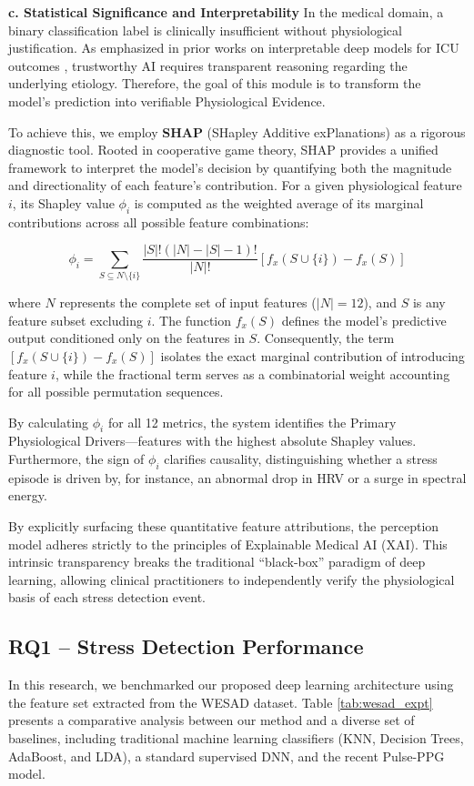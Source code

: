 \documentclass[journal,twoside,web]{ieeecolor}
\begin{document}
\textbf{c. Statistical Significance and Interpretability}
In the medical domain, a binary classification label is clinically insufficient without physiological justification. As emphasized in prior works on interpretable deep models for ICU outcomes \cite{che2017interpretable}, trustworthy AI requires transparent reasoning regarding the underlying etiology. Therefore, the goal of this module is to transform the model's prediction into verifiable Physiological Evidence.

To achieve this, we employ \textbf{SHAP} (SHapley Additive exPlanations) \cite{lundberg2017unified} as a rigorous diagnostic tool. Rooted in cooperative game theory, SHAP provides a unified framework to interpret the model's decision by quantifying both the magnitude and directionality of each feature's contribution. For a given physiological feature $i$, its Shapley value $\phi_i$ is computed as the weighted average of its marginal contributions across all possible feature combinations:

\begin{equation}
\phi_i = \sum_{S \subseteq N \setminus \{i\}} \frac{|S|! (|N| - |S| - 1)!}{|N|!} \left[ f_x(S \cup \{i\}) - f_x(S) \right]
\end{equation}

where $N$ represents the complete set of input features ($|N|=12$), and $S$ is any feature subset excluding $i$. The function $f_x(S)$ defines the model's predictive output conditioned only on the features in $S$. Consequently, the term $\left[ f_x(S \cup \{i\}) - f_x(S) \right]$ isolates the exact marginal contribution of introducing feature $i$, while the fractional term serves as a combinatorial weight accounting for all possible permutation sequences.

By calculating $\phi_i$ for all 12 metrics, the system identifies the Primary Physiological Drivers—features with the highest absolute Shapley values. Furthermore, the sign of $\phi_i$ clarifies causality, distinguishing whether a stress episode is driven by, for instance, an abnormal drop in HRV or a surge in spectral energy. 

By explicitly surfacing these quantitative feature attributions, the perception model adheres strictly to the principles of Explainable Medical AI (XAI). This intrinsic transparency breaks the traditional ``black-box'' paradigm of deep learning, allowing clinical practitioners to independently verify the physiological basis of each stress detection event.

\subsection{RQ1 – Stress Detection Performance}
In this research, we benchmarked our proposed deep learning architecture using the feature set extracted from the WESAD dataset. Table \ref{tab:wesad_expt} presents a comparative analysis between our method and a diverse set of baselines, including traditional machine learning classifiers (KNN, Decision Trees, AdaBoost, and LDA)\cite{schmidt2018introducing}, a standard supervised DNN, and the recent Pulse-PPG\cite{saha2025pulse} model.
\end{document}
